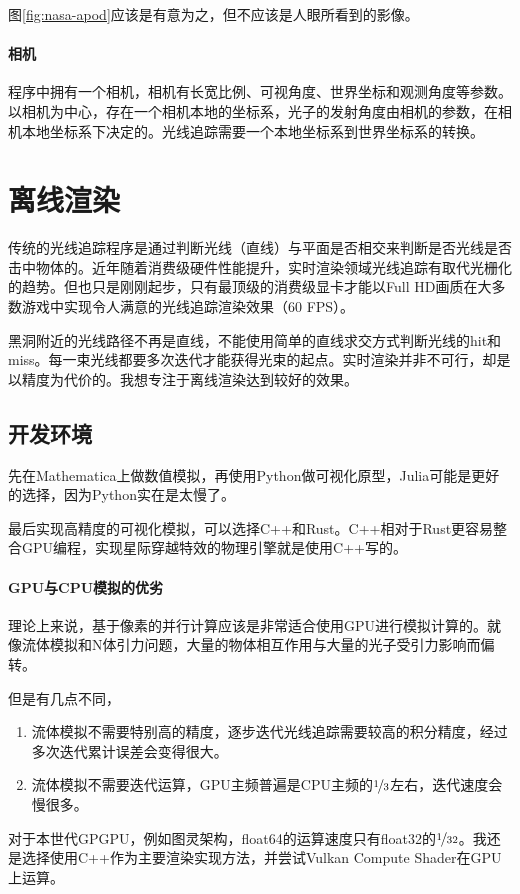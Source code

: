 图\ref{fig:nasa-apod}应该是有意为之\cite{riazuelo_seeing_2018}，但不应该是人眼所看到的影像。

\paragraph{相机}
程序中拥有一个相机，相机有长宽比例、可视角度、世界坐标和观测角度等参数。以相机为中心，存在一个相机本地的坐标系，光子的发射角度由相机的参数，在相机本地坐标系下决定的。光线追踪需要一个本地坐标系到世界坐标系的转换。


\section{离线渲染}
传统的光线追踪程序是通过判断光线（直线）与平面是否相交来判断是否光线是否击中物体的。近年随着消费级硬件性能提升，实时渲染领域光线追踪有取代光栅化的趋势。但也只是刚刚起步，只有最顶级的消费级显卡才能以Full HD画质在大多数游戏中实现令人满意的光线追踪渲染效果（60 FPS）。

黑洞附近的光线路径不再是直线，不能使用简单的直线求交方式判断光线的hit和miss。每一束光线都要多次迭代才能获得光束的起点。实时渲染并非不可行，却是以精度为代价的。我想专注于离线渲染达到较好的效果。
\subsection{开发环境}
先在Mathematica上做数值模拟，再使用Python做可视化原型，Julia可能是更好的选择，因为Python实在是太慢了。

最后实现高精度的可视化模拟，可以选择C++和Rust。C++相对于Rust更容易整合GPU编程，实现星际穿越特效的物理引擎就是使用C++写的\cite{james_gravitational_2015}。
\paragraph{GPU与CPU模拟的优劣}
理论上来说，基于像素的并行计算应该是非常适合使用GPU进行模拟计算的。就像流体模拟和N体引力问题，大量的物体相互作用与大量的光子受引力影响而偏转。

但是有几点不同，
\begin{enumerate}
    \item 流体模拟不需要特别高的精度，逐步迭代光线追踪需要较高的积分精度，经过多次迭代累计误差会变得很大。
    \item 流体模拟不需要迭代运算，GPU主频普遍是CPU主频的$\nicefrac{1}{3}$左右，迭代速度会慢很多。
\end{enumerate}
对于本世代GPGPU，例如图灵架构，float64的运算速度只有float32的$\nicefrac{1}{32}$\cite{nvidia-turing-architecture-whitepaper}。我还是选择使用C++作为主要渲染实现方法，并尝试Vulkan Compute Shader在GPU上运算。

